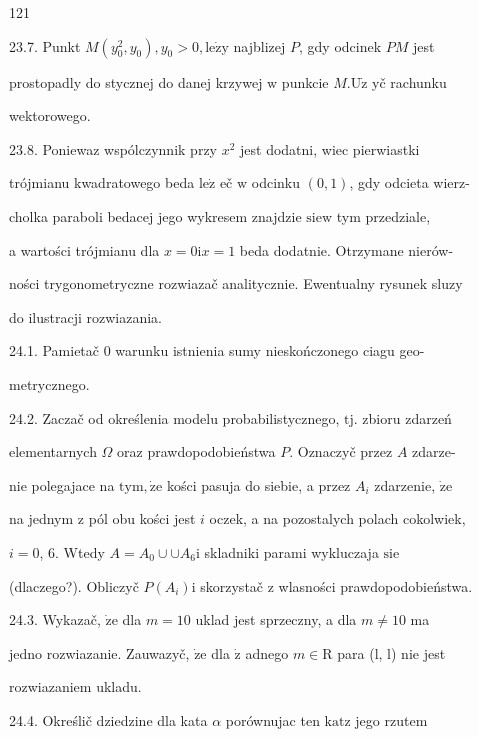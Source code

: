\documentclass[a4paper,12pt]{article}
\begin{document}
121

23.7. Punkt $M(y_{0}^{2},y_{0}), y_{0}>0, \mathrm{l}\mathrm{e}\dot{\mathrm{z}}\mathrm{y}$ najblizej $P$, gdy odcinek $PM$ jest

prostopadly do stycznej do danej krzywej $\mathrm{w}$ punkcie $M. \mathrm{U}\dot{\mathrm{z}}$ yč rachunku

wektorowego.

23.8. Poniewaz wspólczynnik przy $x^{2}$ jest dodatni, wiec pierwiastki

trójmianu kwadratowego beda $\mathrm{l}\mathrm{e}\dot{\mathrm{z}}$ eč $\mathrm{w}$ odcinku $(0,1)$, gdy odcieta wierz-

cholka paraboli bedacej jego wykresem znajdzie $\mathrm{s}\mathrm{i}\mathrm{e} \mathrm{w}$ tym przedziale,

a wartości trójmianu dla $x=0\mathrm{i}x=1$ beda dodatnie. Otrzymane nierów-

ności trygonometryczne rozwiazač analitycznie. Ewentualny rysunek sluzy

do ilustracji rozwiazania.

24.1. Pamietač 0 warunku istnienia sumy nieskończonego ciagu geo-

metrycznego.

24.2. Zaczač od określenia modelu probabilistycznego, $\mathrm{t}\mathrm{j}$. zbioru zdarzeń

elementarnych $\Omega$ oraz prawdopodobieństwa $P$. Oznaczyč przez $A$ zdarze-

nie polegajace na $\mathrm{t}\mathrm{y}\mathrm{m}, \dot{\mathrm{z}}\mathrm{e}$ kości pasuja do siebie, a przez $A_{i}$ zdarzenie, $\dot{\mathrm{z}}\mathrm{e}$

na jednym $\mathrm{z}$ pól obu kości jest $i$ oczek, a na pozostalych polach cokolwiek,

$i=0$, 6. Wtedy $ A=A_{0}\cup \cup A_{6} \mathrm{i}$ skladniki parami wykluczaja $\mathrm{s}\mathrm{i}\mathrm{e}$

(dlaczego?). Obliczyč $P(A_{i})\mathrm{i}$ skorzystač $\mathrm{z}$ wlasności prawdopodobieństwa.

24.3. Wykazač, $\dot{\mathrm{z}}\mathrm{e}$ dla $m=10$ uklad jest sprzeczny, a dla $m\neq 10$ ma

jedno rozwiazanie. Zauwazyč, $\dot{\mathrm{z}}\mathrm{e}$ dla $\dot{\mathrm{z}}$ adnego $m \in \mathrm{R}$ para (l, l) nie jest

rozwiazaniem ukladu.

24.4. Określič dziedzine dla kata $\alpha$ porównujac ten $\mathrm{k}\mathrm{a}\mathrm{t}\mathrm{z}$ jego rzutem
\end{document}
